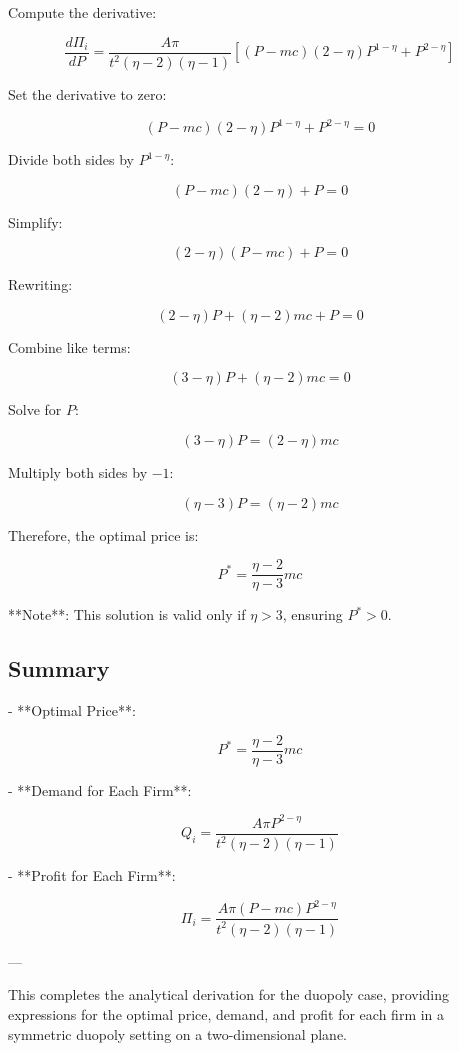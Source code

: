 Compute the derivative:

\[
\frac{d\Pi_i}{dP} = \frac{A \pi}{t^2 (\eta - 2)(\eta - 1)} \left[ (P - mc)(2 - \eta) P^{1 - \eta} + P^{2 - \eta} \right]
\]

Set the derivative to zero:

\[
(P - mc)(2 - \eta) P^{1 - \eta} + P^{2 - \eta} = 0
\]

Divide both sides by \( P^{1 - \eta} \):

\[
(P - mc)(2 - \eta) + P = 0
\]

Simplify:

\[
(2 - \eta)(P - mc) + P = 0
\]

Rewriting:

\[
(2 - \eta) P + (\eta - 2) mc + P = 0
\]

Combine like terms:

\[
(3 - \eta) P + (\eta - 2) mc = 0
\]

Solve for \( P \):

\[
(3 - \eta) P = (2 - \eta) mc
\]

Multiply both sides by \( -1 \):

\[
(\eta - 3) P = (\eta - 2) mc
\]

Therefore, the optimal price is:

\[
P^* = \frac{\eta - 2}{\eta - 3} mc
\]

**Note**: This solution is valid only if \( \eta > 3 \), ensuring \( P^* > 0 \).

\subsection{Summary}

- **Optimal Price**:

  \[
  P^* = \frac{\eta - 2}{\eta - 3} mc
  \]

- **Demand for Each Firm**:

  \[
  Q_i = \frac{A \pi P^{2 - \eta}}{t^2 (\eta - 2)(\eta - 1)}
  \]

- **Profit for Each Firm**:

  \[
  \Pi_i = \frac{A \pi (P - mc) P^{2 - \eta}}{t^2 (\eta - 2)(\eta - 1)}
  \]

---

This completes the analytical derivation for the duopoly case, providing expressions for the optimal price, demand, and profit for each firm in a symmetric duopoly setting on a two-dimensional plane.



\appendix

